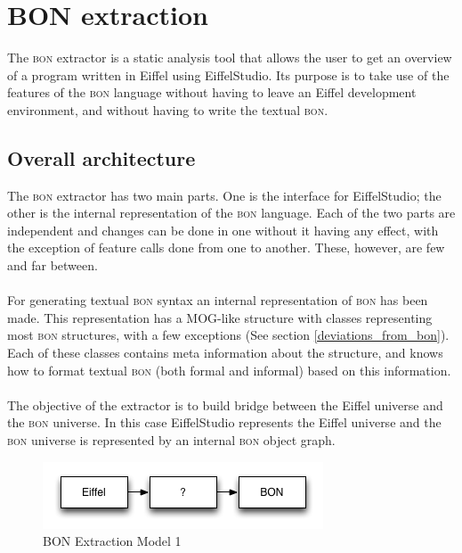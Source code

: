 \section{BON extraction}
The \textsc{bon} extractor is a static analysis tool that allows the user to get an overview of a program written in Eiffel using EiffelStudio. Its purpose is to take use of the features of the \textsc{bon} language without having to leave an Eiffel development environment, and without having to write the textual \textsc{bon}.

\subsection{Overall architecture}
The \textsc{bon} extractor has two main parts. One is the interface for EiffelStudio; the other is the internal representation of the \textsc{bon} language. Each of the two parts are independent and changes can be done in one without it having any effect, with the exception of feature calls done from one to another. These, however, are few and far between. 

\paragraph{}
For generating textual \textsc{bon} syntax an internal representation of \textsc{bon} has been made. This representation has a MOG-like structure with classes representing most \textsc{bon} structures, with a few exceptions (See section \ref{deviations_from_bon}).  Each of these classes contains meta information about the structure, and knows how to format textual \textsc{bon} (both formal and informal) based on this information. 

\paragraph{}
The objective of the extractor is to build bridge between the Eiffel universe and the \textsc{bon} universe.  In this case EiffelStudio represents the Eiffel universe and the \textsc{bon} universe is represented by an internal \textsc{bon} object graph.
\begin{figure}[H]
\centering
\includegraphics[scale=0.8]{images/BON-extraction-model-1.png}
\caption{BON Extraction Model 1}
\label{fig:bon_extraction_1}
\end{figure}

